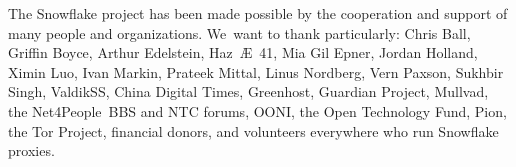 \documentclass[letterpaper,twocolumn]{article}
\begin{document}
The Snowflake project has been made possible
by the cooperation and support of many people
and organizations.
We~want to thank particularly:
Chris Ball, %
Griffin Boyce, %
Arthur Edelstein, %
Haz~Æ~41, %
Mia Gil Epner, %
Jordan Holland, %
Ximin Luo, %
Ivan Markin, %
Prateek Mittal, %
Linus Nordberg, %
Vern Paxson, %
Sukhbir Singh, %
ValdikSS, %
China Digital Times,
Greenhost, %
Guardian Project, %
Mullvad, %
the Net4People~BBS and NTC forums, %
OONI, %
the Open Technology Fund, %
Pion,
the Tor Project,
financial donors,
and volunteers everywhere who run Snowflake proxies.



\end{document}
